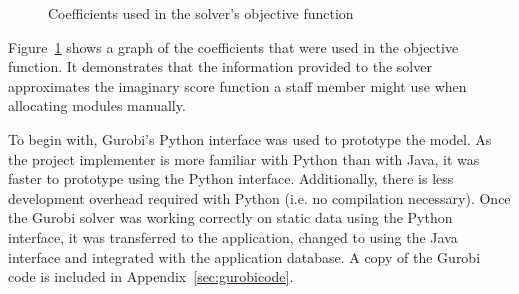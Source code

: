 \begin{figure}
  \begin{center}
  \end{center}
  \caption{Coefficients used in the solver's objective function}
  \label{gurobi_coeff}
\end{figure}

Figure~\ref{gurobi_coeff} shows a graph of the coefficients that were used in
the objective function. It demonstrates that the information provided to the
solver approximates the imaginary score function a staff member might use when
allocating modules manually.

To begin with, Gurobi's Python interface was used
to prototype the model. As the project implementer is more familiar with
Python than with Java, it was faster to prototype using the Python interface.
Additionally, there is less development overhead required with Python (i.e. no
compilation necessary). Once the Gurobi solver was working correctly on static
data using the Python interface, it was transferred to the application,
changed to using the Java interface and integrated with the application
database. A copy of the Gurobi code is included in
Appendix~\ref{sec:gurobicode}.
